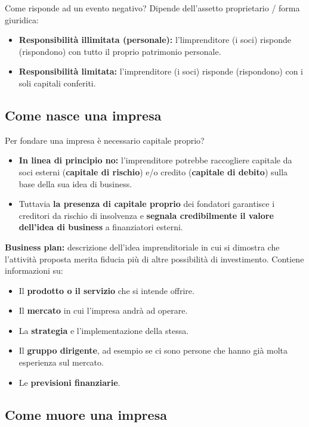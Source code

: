 \documentclass[../main.tex]{subfiles}
\begin{document}
Come risponde ad un evento negativo? Dipende dell'assetto proprietario / forma giuridica:
\begin{itemize}
\item
\textbf{Responsibilità illimitata (personale):} l'limprenditore  (i soci) risponde (rispondono) con tutto il proprio patrimonio personale.
\item
\textbf{Responsibilità limitata:} l'imprenditore (i soci) risponde (rispondono) con i soli capitali conferiti.
\end{itemize}

\subsection{Come nasce una impresa}

Per fondare una impresa è necessario capitale proprio?
\begin{itemize}
\item
\textbf{In linea di principio no:} l'imprenditore potrebbe raccogliere capitale da soci esterni (\textbf{capitale di rischio}) e/o credito (\textbf{capitale di debito}) sulla base della sua idea di business.

\item
Tuttavia \textbf{la presenza di capitale proprio} dei fondatori garantisce i creditori da rischio di insolvenza e \textbf{segnala credibilmente il valore dell'idea di business} a finanziatori esterni.
\end{itemize}

\textbf{Business plan:} descrizione dell'idea imprenditoriale in cui si dimostra che l'attività proposta merita fiducia più di altre possibilità di investimento. Contiene informazioni su:
\begin{itemize}
\item Il \textbf{prodotto o il servizio} che si intende offrire.
\item Il \textbf{mercato} in cui l'impresa andrà ad operare.
\item La \textbf{strategia} e l'implementazione della stessa.
\item Il \textbf{gruppo dirigente}, ad esempio se ci sono persone che hanno già molta esperienza sul mercato.
\item Le \textbf{previsioni finanziarie}.
\end{itemize}

\subsection{Come muore una impresa}
\end{document}
